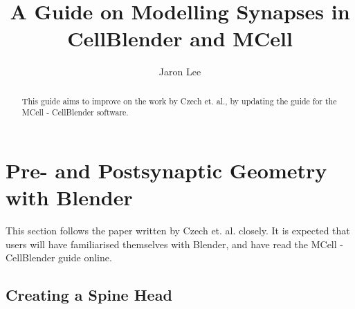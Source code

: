 \documentclass[twoside,a4paper]{refart}
\title{A Guide on Modelling Synapses in CellBlender and MCell}
\author{Jaron Lee}
\date{}
\begin{document}
\maketitle

\begin{abstract}
    This guide aims to improve on the work by Czech et. al., by updating the guide for the MCell - CellBlender software.
\end{abstract}

\newpage



\section{Pre- and Postsynaptic Geometry with Blender}
This section follows the paper written by Czech et. al. closely. It is expected that users will have familiarised themselves with Blender, and have read the MCell - CellBlender guide online.

\subsection{Creating a Spine Head}
\end{document}
